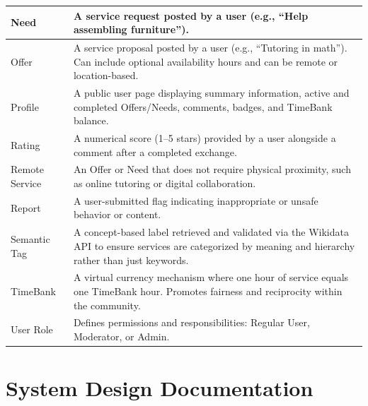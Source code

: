 \documentclass[11pt,a4paper]{report}
\begin{document}
\begin{longtable}{|p{3.5cm}|p{11cm}|}
    \hline
    Need                 & A service request posted by a user (e.g., ``Help assembling furniture'').                                                                                               \\
    \hline
    Offer                & A service proposal posted by a user (e.g., ``Tutoring in math''). Can include optional availability hours and can be remote or location-based.                          \\
    \hline
    Profile              & A public user page displaying summary information, active and completed Offers/Needs, comments, badges, and TimeBank balance.                                           \\
    \hline
    Rating               & A numerical score (1--5 stars) provided by a user alongside a comment after a completed exchange.                                                                       \\
    \hline
    Remote Service       & An Offer or Need that does not require physical proximity, such as online tutoring or digital collaboration.                                                            \\
    \hline
    Report               & A user-submitted flag indicating inappropriate or unsafe behavior or content.                                                                                           \\
    \hline
    Semantic Tag         & A concept-based label retrieved and validated via the Wikidata API to ensure services are categorized by meaning and hierarchy rather than just keywords.               \\
    \hline
    TimeBank             & A virtual currency mechanism where one hour of service equals one TimeBank hour. Promotes fairness and reciprocity within the community.                                \\
    \hline
    User Role            & Defines permissions and responsibilities: Regular User, Moderator, or Admin.                                                                                            \\
    \hline
\end{longtable}

\chapter{System Design Documentation}
\label{chap:design}
\end{document}
